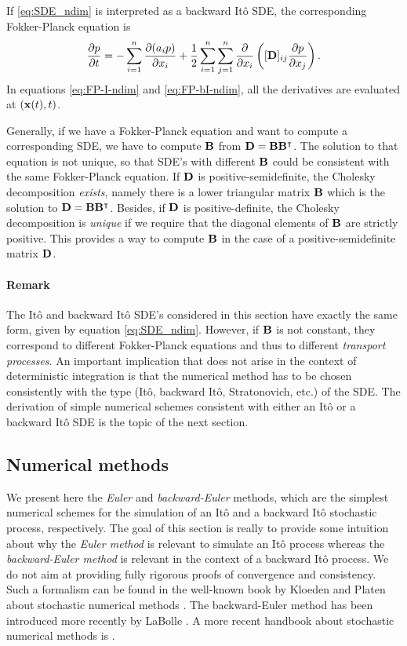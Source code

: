 If \eqref{eq:SDE_ndim} is interpreted as a backward Itô SDE, the corresponding Fokker-Planck equation is
\begin{equation} \label{eq:FP-bI-ndim}
	\frac{\partial p}{\partial t} = -\sum_{i=1}^n \frac{\partial(a_ip)}{\partial x_i} + \frac{1}{2} \sum_{i=1}^n \sum_{j=1}^n \frac{\partial}{\partial x_i}\left( [\mathbf D]_{ij} \frac{\partial p}{\partial x_j} \right).
\end{equation}
In equations \eqref{eq:FP-I-ndim} and \eqref{eq:FP-bI-ndim}, all the derivatives are evaluated at $(\mathbf x(t),t)$.

Generally, if we have a Fokker-Planck equation and want to compute a corresponding SDE, we have to compute $\mathbf B$ from $\mathbf D = \mathbf B \mathbf B^{\intercal}$. The solution to that equation is not unique, so that SDE's with different $\mathbf B$ could be consistent with the same Fokker-Planck equation. If $\mathbf D$ is positive-semidefinite, the Cholesky decomposition \textit{exists}, namely there is a lower triangular matrix $\mathbf B$ which is the solution to $\mathbf D = \mathbf B \mathbf B^{\intercal}$. Besides, if $\mathbf D$ is positive-definite, the Cholesky decomposition is \textit{unique} if we require that the diagonal elements of $\mathbf B$ are strictly positive. This provides a way to compute $\mathbf B$ in the case of a positive-semidefinite matrix $\mathbf D$.

\paragraph{Remark} The Itô and backward Itô SDE's considered in this section have exactly the same form, given by equation \eqref{eq:SDE_ndim}. However, if $\mathbf B$ is not constant, they correspond to different Fokker-Planck equations and thus to different \textit{transport processes}. An important implication that does not arise in the context of deterministic integration is that the numerical method has to be chosen consistently with the type (Itô, backward Itô, Stratonovich, etc.) of the SDE. The derivation of simple numerical schemes consistent with either an Itô or a backward Itô SDE is the topic of the next section.

\subsection{Numerical methods} \label{sec:numericalmethods}
We present here the \textit{Euler} and \textit{backward-Euler} methods, which are the simplest numerical schemes for the simulation of an Itô and a backward Itô stochastic process, respectively. The goal of this section is really to provide some intuition about why the \textit{Euler method} is relevant to simulate an Itô process whereas the \textit{backward-Euler method} is relevant in the context of a backward Itô process. We do not aim at providing fully rigorous proofs of convergence and consistency. Such a formalism can be found in the well-known book by Kloeden and Platen about stochastic numerical methods \cite{kloedenplaten1995numerical}. The backward-Euler method has been introduced more recently by LaBolle \cite{labolle2000diffusion}. A more recent handbook about stochastic numerical methods is \cite{colet2014stochastic}.

